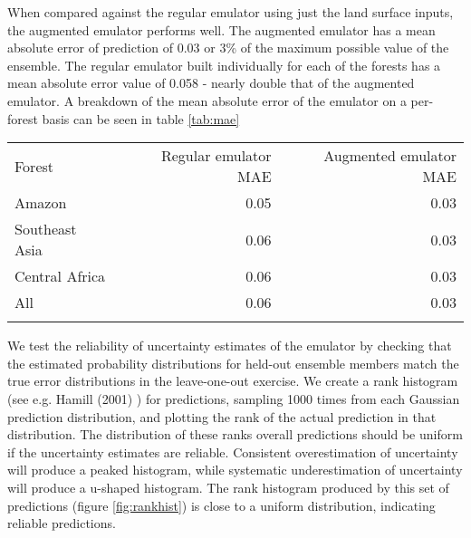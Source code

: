 \documentclass[gmd, manuscript]{copernicus}
\begin{document}
When compared against the regular emulator using just the land surface inputs, the augmented emulator performs well. The augmented emulator has a mean absolute error of prediction of 0.03 or 3\% of the maximum possible value of the ensemble. The regular emulator built individually for each of the forests has a mean absolute error value of 0.058 - nearly double that of the augmented emulator. A breakdown of the mean absolute error of the emulator on a per-forest basis can be seen in table \ref{tab:mae}



\begin{table*}[t]
\caption{Mean absolute error (MAE) rounded to the first significant figure for the regular emulator, using just the seven land surface inputs, and the augmented emulator, including temperature and precipitation.}
\begin{tabular}{lrr}
\tophline

Forest                & Regular emulator MAE & Augmented emulator MAE \\
\middlehline
Amazon              & 0.05                              & 0.03                                     \\
Southeast Asia  & 0.06                               & 0.03                                    \\
Central Africa    & 0.06                               & 0.03                                      \\
All                      & 0.06                              & 0.03                                       \\

\bottomhline
\end{tabular}
\belowtable{} %
\label{tab:mae}
\end{table*}

We test the reliability of uncertainty estimates of the emulator by checking that the estimated probability distributions for held-out ensemble members match the true error distributions in the leave-one-out exercise. We create a rank histogram (see e.g. Hamill (2001) \cite{hamill2001interpretation}) for predictions, sampling 1000 times from each Gaussian prediction distribution, and plotting the rank of the actual prediction in that distribution. The distribution of these ranks overall predictions should be uniform if the uncertainty estimates are reliable. Consistent overestimation of uncertainty will produce a peaked histogram, while systematic underestimation of uncertainty will produce a u-shaped histogram. The rank histogram produced by this set of predictions (figure \ref{fig:rankhist}) is close to a uniform distribution, indicating reliable predictions.
\end{document}
